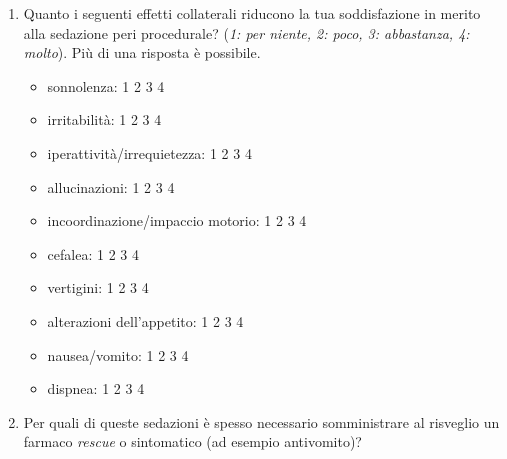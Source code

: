 \begin{tcolorbox}
\begin{enumerate}
           \item Quanto i seguenti effetti collaterali riducono la tua soddisfazione in merito alla sedazione peri procedurale? (\emph{1: per niente, 2: poco, 3: abbastanza, 4: molto}). Più di una risposta è possibile. 
           \begin{itemize}
               \item sonnolenza:     \colorbox{xkcdCloudyBlue!70}{1} \colorbox{xkcdCloudyBlue!70}{2} \colorbox{xkcdCloudyBlue!70}{3} \colorbox{xkcdCloudyBlue!70}{4}
               \item irritabilità:   \colorbox{xkcdCloudyBlue!70}{1} \colorbox{xkcdCloudyBlue!70}{2} \colorbox{xkcdCloudyBlue!70}{3} \colorbox{xkcdCloudyBlue!70}{4}
               \item iperattività/irrequietezza: \colorbox{xkcdCloudyBlue!70}{1} \colorbox{xkcdCloudyBlue!70}{2} \colorbox{xkcdCloudyBlue!70}{3} \colorbox{xkcdCloudyBlue!70}{4}
               \item allucinazioni: \colorbox{xkcdCloudyBlue!70}{1} \colorbox{xkcdCloudyBlue!70}{2} \colorbox{xkcdCloudyBlue!70}{3} \colorbox{xkcdCloudyBlue!70}{4}
               \item incoordinazione/impaccio motorio: \colorbox{xkcdCloudyBlue!70}{1} \colorbox{xkcdCloudyBlue!70}{2} \colorbox{xkcdCloudyBlue!70}{3} \colorbox{xkcdCloudyBlue!70}{4}
               \item cefalea: \colorbox{xkcdCloudyBlue!70}{1} \colorbox{xkcdCloudyBlue!70}{2} \colorbox{xkcdCloudyBlue!70}{3} \colorbox{xkcdCloudyBlue!70}{4}
               \item vertigini: \colorbox{xkcdCloudyBlue!70}{1} \colorbox{xkcdCloudyBlue!70}{2} \colorbox{xkcdCloudyBlue!70}{3} \colorbox{xkcdCloudyBlue!70}{4}
               \item alterazioni dell’appetito: \colorbox{xkcdCloudyBlue!70}{1} \colorbox{xkcdCloudyBlue!70}{2} \colorbox{xkcdCloudyBlue!70}{3} \colorbox{xkcdCloudyBlue!70}{4}
               \item nausea/vomito: \colorbox{xkcdCloudyBlue!70}{1} \colorbox{xkcdCloudyBlue!70}{2} \colorbox{xkcdCloudyBlue!70}{3} \colorbox{xkcdCloudyBlue!70}{4}
               \item dispnea: \colorbox{xkcdCloudyBlue!70}{1} \colorbox{xkcdCloudyBlue!70}{2} \colorbox{xkcdCloudyBlue!70}{3} \colorbox{xkcdCloudyBlue!70}{4}
           \end{itemize}
           
           \item Per quali di queste sedazioni è spesso necessario somministrare al risveglio un farmaco \emph{rescue} o sintomatico (ad esempio antivomito)?
           

\end{enumerate}
\end{tcolorbox}
